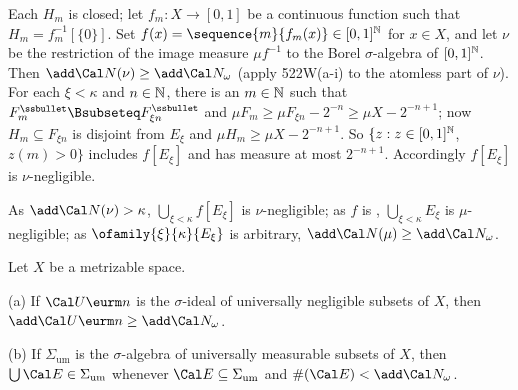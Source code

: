 {Each $H_m$ is closed;  let $f_m:X\to[0,1]$ be a continuous function
such that $H_m=f_m^{-1}[\{0\}]$.   Set
$f(x)=\sequence{m}{f_m(x)}\in[0,1]^{\Bbb N}$ for $x\in X$, and let $\nu$ be
the restriction of the image measure $\mu f^{-1}$ to the Borel
$\sigma$-algebra of $[0,1]^{\Bbb N}$.   Then
$\add\Cal N(\nu)\ge\add\Cal N_{\omega}$ (apply 522W(a-i) to the atomless
part of $\nu$).   For each $\xi<\kappa$ and $n\in\Bbb N$, there is an
$m\in\Bbb N$ such that $F_m^{\ssbullet}\Bsubseteq F_{\xi n}^{\ssbullet}$
and $\mu F_m\ge\mu F_{\xi n}-2^{-n}\ge\mu X-2^{-n+1}$;  now
$H_m\subseteq F_{\xi n}$ is disjoint from $E_{\xi}$ and
$\mu H_m\ge\mu X-2^{-n+1}$.
So $\{z:z\in[0,1]^{\Bbb N}$, $z(m)>0\}$ includes
$f[E_{\xi}]$ and has measure at most $2^{-n+1}$.   Accordingly $f[E_{\xi}]$
is $\nu$-negligible.

As $\add\Cal N(\nu)>\kappa$, $\bigcup_{\xi<\kappa}f[E_{\xi}]$ is
$\nu$-negligible;  as $f$ is \imp, $\bigcup_{\xi<\kappa}E_{\xi}$ is
$\mu$-negligible;  as $\ofamily{\xi}{\kappa}{E_{\xi}}$ is arbitrary,
$\add\Cal N(\mu)\ge\add\Cal N_{\omega}$.
}%

  Let $X$ be a metrizable space.

(a) If $\CalUn$ is the $\sigma$-ideal of universally negligible
subsets of $X$, then $\add\CalUn\ge\add\Cal N_{\omega}$.

(b) If $\Sigma_{\text{um}}$ is the $\sigma$-algebra of universally
measurable subsets of $X$, then $\bigcup\Cal E\in\Sigma_{\text{um}}$
whenever $\Cal E\subseteq\Sigma_{\text{um}}$ and
$\#(\Cal E)<\add\Cal N_{\omega}$.


